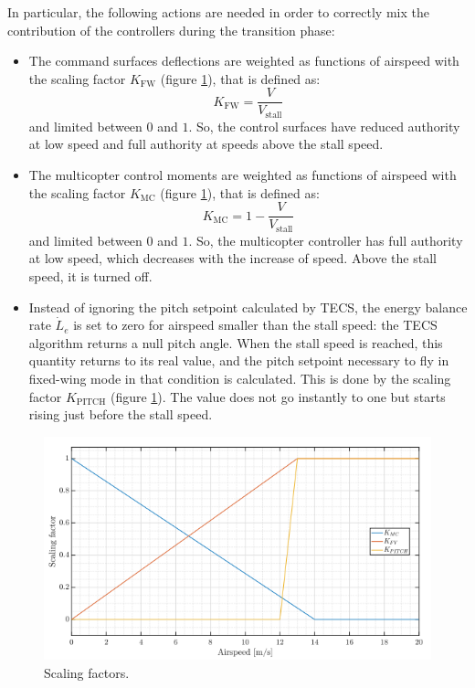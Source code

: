 In particular, the following actions are needed in order to correctly mix the contribution of the controllers during the transition phase:

\begin{itemize}
    \item The command surfaces deflections are weighted as functions of airspeed with the scaling factor $K_{\text{FW}}$ (figure \ref{fig:Scaling factors}), that is defined as:
    \begin{equation}
        K_{\text{FW}} = \frac{V}{V_{\text{stall}}}
    \end{equation}
    and limited between $0$ and $1$. So, the control surfaces have reduced authority at low speed and full authority at speeds above the stall speed.
    
    \item The multicopter control moments are weighted as functions of airspeed with the scaling factor $K_{\text{MC}}$ (figure \ref{fig:Scaling factors}), that is defined as:
    \begin{equation}
        K_{\text{MC}} = 1 - \frac{V}{V_{\text{stall}}}
    \end{equation}
    and limited between $0$ and $1$. So, the multicopter controller has full authority at low speed, which decreases with the increase of speed. Above the stall speed, it is turned off.
    
    \item Instead of ignoring the pitch setpoint calculated by TECS, the energy balance rate $\dot{L}_e$ is set to zero for airspeed smaller than the stall speed: the TECS algorithm returns a null pitch angle. When the stall speed is reached, this quantity returns to its real value, and the pitch setpoint necessary to fly in fixed-wing mode in that condition is calculated. This is done by the scaling factor $K_{\text{PITCH}}$ (figure \ref{fig:Scaling factors}). The value does not go instantly to one but starts rising just before the stall speed.
\end{itemize}

\begin{figure}
    \centering
    \includegraphics[width=0.85\linewidth]{Images/Scaling factors.png}
    \caption{Scaling factors.}
    \label{fig:Scaling factors}
\end{figure}

